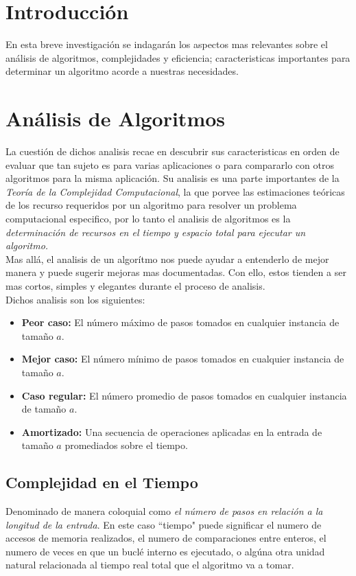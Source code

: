 \documentclass[letterpaper, 12pt]{article}
\begin{document}
    \newpage
    \begin{justify}
        \setcounter{page}{1}
        \thispagestyle{fancy}
        \section{Introducción}
        En esta breve investigación se indagarán los aspectos mas relevantes sobre el análisis de algoritmos, complejidades y eficiencia; caracteristicas importantes para determinar un algoritmo acorde a nuestras necesidades.
        \section{Análisis de Algoritmos}
        La cuestión de dichos analisis recae en descubrir sus caracteristicas en orden de evaluar que tan sujeto es para varias aplicaciones
        o para compararlo con otros algoritmos para la misma aplicación. Su analisis es una parte importantes de la \emph{Teoría de la Complejidad Computacional}, la que porvee las estimaciones
        teóricas de los recurso requeridos por un algoritmo para resolver un problema computacional especifico, por lo tanto el analisis de algoritmos es la \emph{determinación de recursos en el tiempo y espacio total para ejecutar un algoritmo.} 
        \\ \newline Mas allá, el analisis de un algorítmo nos puede ayudar a entenderlo de mejor manera y puede sugerir mejoras mas documentadas. Con ello, estos tienden a ser mas cortos, simples y elegantes durante el proceso de analisis. 
        \\ Dichos analisis son los siguientes:
        \begin{itemize}
            \item \textbf{Peor caso:} El número máximo de pasos tomados en cualquier instancia de tamaño \(a\).
            \item \textbf{Mejor caso:} El número mínimo de pasos tomados en cualquier instancia de tamaño \(a\).
            \item \textbf{Caso regular:} El número promedio de pasos tomados en cualquier instancia de tamaño \(a\).
            \item \textbf{Amortizado:} Una secuencia de operaciones aplicadas en la entrada de tamaño \(a\) promediados sobre el tiempo.
        \end{itemize}
        \subsection{Complejidad en el Tiempo}
        Denominado de manera coloquial como \emph{el número de pasos en relación a la longitud de la entrada}. En este caso ``tiempo" puede significar el numero de accesos de memoria realizados, el numero de comparaciones entre enteros, el numero de veces
        en que un buclé interno es ejecutado, o algúna otra unidad natural relacionada al tiempo real total que el algoritmo va a tomar.

\end{justify}
\end{document}

